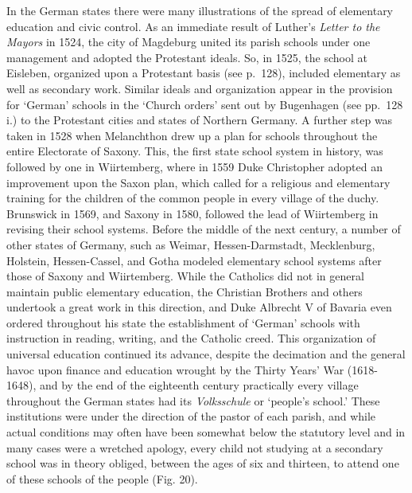 \documentclass[
]{book}
\begin{document}
In the German states there were many illustrations of the spread of elementary education and civic control. As an immediate result of Luther's \emph{Letter to the Mayors} in 1524, the city of Magdeburg united its parish schools under one management and adopted the Protestant ideals. So, in 1525, the school at Eisleben, organized upon a Protestant basis (see p.~128), included elementary as well as secondary work. Similar ideals and organization appear in the provision for `German' schools in the `Church orders' sent out by Bugenhagen (see pp.~128 i.) to the Protestant cities and states of Northern Germany. A further step was taken in 1528 when Melanchthon drew up a plan for schools throughout the entire Electorate of Saxony. This, the first state school system in history, was followed by one in Wiirtemberg, where in 1559 Duke Christopher adopted an improvement upon the Saxon plan, which called for a religious and elementary training for the children of the common people in every village of the duchy. Brunswick in 1569, and Saxony in 1580, followed the lead of Wiirtemberg in revising their school systems. Before the middle of the next century, a number of other states of Germany, such as Weimar, Hessen-Darmstadt, Mecklenburg, Holstein, Hessen-Cassel, and Gotha modeled elementary school systems after those of Saxony and Wiirtemberg. While the Catholics did not in general maintain public elementary education, the Christian Brothers and others undertook a great work in this direction, and Duke Albrecht V of Bavaria even ordered throughout his state the establishment of `German' schools with instruction in reading, writing, and the Catholic creed. This organization of universal education continued its advance, despite the decimation and the general havoc upon finance and education wrought by the Thirty Years' War (1618-1648), and by the end of the eighteenth century practically every village throughout the German states had its \emph{Volksschule} or `people's school.' These institutions were under the direction of the pastor of each parish, and while actual conditions may often have been somewhat below the statutory level and in many cases were a wretched apology, every child not studying at a secondary school was in theory obliged, between the ages of six and thirteen, to attend one of these schools of the people (Fig. 20).
\end{document}
